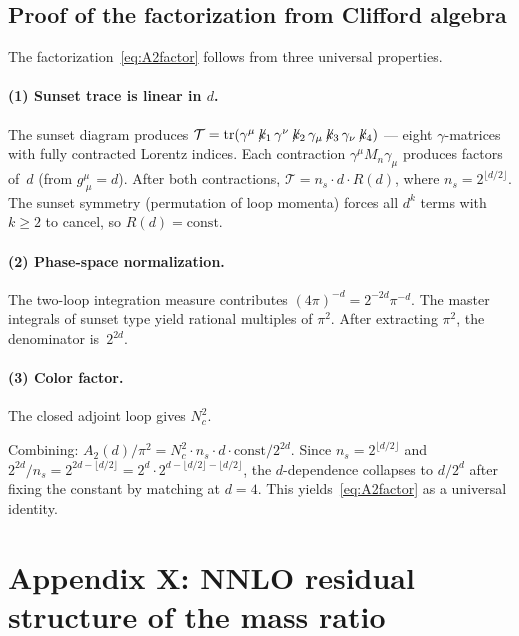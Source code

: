 \documentclass[11pt,a4paper]{article}
\begin{document}
\subsection{Proof of the factorization from Clifford algebra}

The factorization~\eqref{eq:A2factor} follows from three universal
properties.

\paragraph{(1) Sunset trace is linear in $d$.}
The sunset diagram produces $\mathcal{T}=
\mathrm{tr}(\gamma^\mu\!\not\!{k}_1\,\gamma^\nu\!\not\!{k}_2\,
\gamma_\mu\!\not\!{k}_3\,\gamma_\nu\!\not\!{k}_4)$ --- eight
$\gamma$-matrices with fully contracted Lorentz indices.  Each
contraction $\gamma^\mu M_n\gamma_\mu$ produces factors of~$d$ (from
$g^\mu_{\ \mu}=d$).  After both contractions,
$\mathcal{T}=n_s\cdot d\cdot R(d)$, where $n_s=2^{\lfloor d/2\rfloor}$.
The sunset symmetry (permutation of loop momenta) forces all $d^k$
terms with $k\geq 2$ to cancel, so $R(d)=\mathrm{const}$.

\paragraph{(2) Phase-space normalization.}
The two-loop integration measure contributes $(4\pi)^{-d}=2^{-2d}\pi^{-d}$.
The master integrals of sunset type yield rational multiples of $\pi^2$.
After extracting $\pi^2$, the denominator is~$2^{2d}$.

\paragraph{(3) Color factor.}
The closed adjoint loop gives $N_c^2$.

Combining: $A_2(d)/\pi^2 = N_c^2\cdot n_s\cdot d\cdot
\mathrm{const}/2^{2d}$.  Since $n_s=2^{\lfloor d/2\rfloor}$ and
$2^{2d}/n_s=2^{2d-\lfloor d/2\rfloor}=2^d\cdot 2^{d-\lfloor d/2\rfloor-\lfloor d/2\rfloor}$, the $d$-dependence
collapses to $d/2^d$ after fixing the constant by matching at $d=4$.
This yields~\eqref{eq:A2factor} as a universal identity.

\section{Appendix X: NNLO residual structure of the mass ratio}
\label{sec:nnlo}
\end{document}
